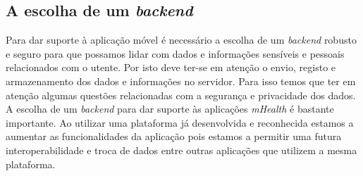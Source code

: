 \subsection{A escolha de um \textit{backend}}
Para dar suporte à aplicação móvel é necessário a escolha de um \textit{backend} robusto e seguro para que possamos lidar com dados e informações sensíveis e pessoais relacionados com o utente. Por isto deve ter-se em atenção o envio, registo e armazenamento dos dados e informações no servidor. Para isso temos que ter em atenção algumas questões relacionadas com a segurança e privacidade dos dados. A escolha de um \textit{backend} para dar suporte às aplicações \textit{mHealth} é bastante importante. Ao utilizar uma plataforma já desenvolvida e reconhecida estamos a aumentar as funcionalidades da aplicação pois estamos a permitir uma futura interoperabilidade e troca de dados entre outras aplicações que utilizem a mesma plataforma.




